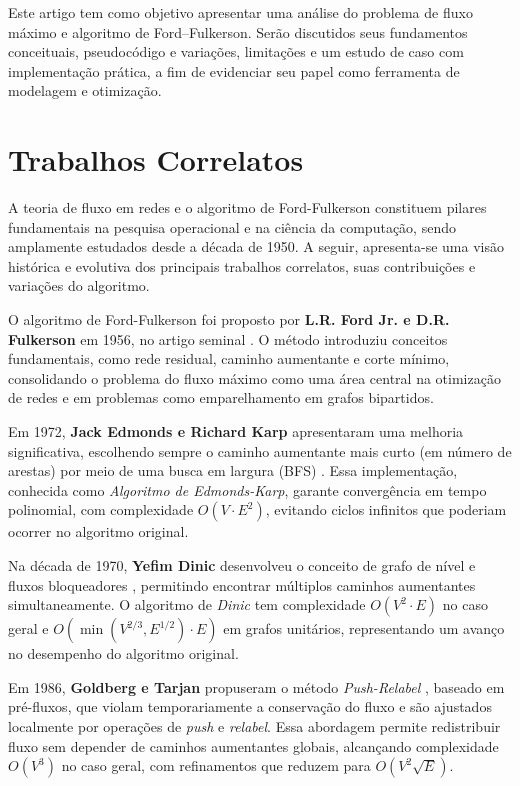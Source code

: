 \documentclass[12pt]{article}
\begin{document}
\noindent Este artigo tem como objetivo apresentar uma análise do problema de fluxo máximo e algoritmo de Ford–Fulkerson. Serão discutidos seus fundamentos conceituais, pseudocódigo e variações, limitações e um estudo de caso com implementação prática, a fim de evidenciar seu papel como ferramenta de modelagem e otimização.


\section{Trabalhos Correlatos} \label{sec:firstpage}

A teoria de fluxo em redes e o algoritmo de Ford-Fulkerson constituem pilares fundamentais na pesquisa operacional e na ciência da computação, sendo amplamente estudados desde a década de 1950. A seguir, apresenta-se uma visão histórica e evolutiva dos principais trabalhos correlatos, suas contribuições e variações do algoritmo.

\noindent O algoritmo de Ford-Fulkerson foi proposto por \textbf{L.R. Ford Jr. e D.R. Fulkerson} em 1956, no artigo seminal \cite{ford1956}. O método introduziu conceitos fundamentais, como rede residual, caminho aumentante e corte mínimo, consolidando o problema do fluxo máximo como uma área central na otimização de redes e em problemas como emparelhamento em grafos bipartidos.

Em 1972, \textbf{Jack Edmonds e Richard Karp} apresentaram uma melhoria significativa, escolhendo sempre o caminho aumentante mais curto (em número de arestas) por meio de uma busca em largura (BFS) \cite{edmonds1972}. Essa implementação, conhecida como \textit{Algoritmo de Edmonds-Karp}, garante convergência em tempo polinomial, com complexidade $O(V \cdot E^2)$, evitando ciclos infinitos que poderiam ocorrer no algoritmo original.

Na década de 1970, \textbf{Yefim Dinic} desenvolveu o conceito de grafo de nível e fluxos bloqueadores \cite{dinic1970}, permitindo encontrar múltiplos caminhos aumentantes simultaneamente. O algoritmo de \textit{Dinic} tem complexidade $O(V^2 \cdot E)$ no caso geral e $O(\min(V^{2/3}, E^{1/2}) \cdot E)$ em grafos unitários, representando um avanço no desempenho do algoritmo original.

Em 1986, \textbf{Goldberg e Tarjan} propuseram o método \textit{Push-Relabel} \cite{goldberg1988}, baseado em pré-fluxos, que violam temporariamente a conservação do fluxo e são ajustados localmente por operações de \textit{push} e \textit{relabel}. Essa abordagem permite redistribuir fluxo sem depender de caminhos aumentantes globais, alcançando complexidade $O(V^3)$ no caso geral, com refinamentos que reduzem para $O(V^2 \sqrt{E})$.
\end{document}

